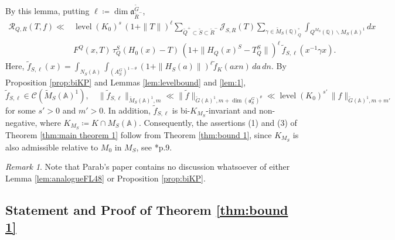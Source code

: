 \documentclass[12pt]{amsart}
\theoremstyle{definition}
\theoremstyle{plain}
\theoremstyle{remark}
\newtheorem{remark}[definition]{Remark}
\def\Q{\mathbb{Q}}%
\def\A{\mathbb{A}}%
\def\bs{\backslash}%
\newcommand{\fa}{\mathfrak{a}}
\newcommand{\cC}{\mathcal{C}}
\newcommand{\cJ}{\mathcal{J}}
\newcommand{\cR}{\mathcal{R}}
\numberwithin{equation}{section}
\newcommand{\tG}{\widetilde{G}}
\newcommand{\tM}{\widetilde{M}}
\newcommand{\tQ}{\widetilde{Q}}
\newcommand{\tR}{\widetilde{R}}
\newcommand{\tS}{\widetilde{S}}
\newcommand{\tf}{\tilde{f}}
\newcommand{\level}{\operatorname{level}}
\begin{document}
By this lemma, putting $\ell \coloneqq \dim\fa_{\tR^-}^{\tG}$, 
\begin{align*}
\cR_{Q,R}(T,f)\ll& \level(K_0)^s \,  (1+\|T\|)^{\ell} \sum_{\tQ^+\subset\tS \subset \tR^-}  \cJ_{S,R}(T)\sum_{\gamma\in \tM_S(\Q)_{Q}^{\circ}} \int_{Q^{M_S}(\Q)\bs M_S(\A)^1}dx   \\  
      & F^Q(x,T)\, \tau_Q^S(H_0(x)-T) \, (1+\|H_Q(x)^S-T_Q^S\|)^{\ell}\, \tf_{S,\ell}(x^{-1}\gamma x). \nonumber
\end{align*}
Here, $\tf_{S,\ell}(x)=\int_{N_S(\A)}\int_{(A_S^G)^{1-\theta}}(1+ \| H_S(a)\| )^{\ell}\tf_{K}(axn)\, da \, dn$. 
By Proposition \ref{prop:biKP} and Lemmas \ref{lem:levelbound} and \ref{lem:1},
\[
\tf_{S,\ell}\in \cC(\tM_S(\A)^1), \quad  \|\tf_{S,\ell}\|_{\tM_S(\A)^1,m} \ll \|\tf\|_{\tG(\A)^1,m+\dim(\fa_S^G)^\theta} \ll \level(K_0)^{s'}\,  \| f \|_{\tG(\A)^1,m+m'}
\]
for some $s'>0$ and $m'>0$. 
In addition, $\tf_{S,\ell}$ is bi-$K_{M_S}$-invariant and non-negative, where $K_{M_S}\coloneqq K\cap M_S(\A)$. 
Consequently, the assertions (1) and (3) of Theorem \ref{thm:main theorem 1} follow from Theorem \ref{thm:bound 1}, since $K_{M_S}$ is also admissible relative to $M_0$ in $M_S$, see \cite{Art81}*{p.9}. 
\begin{remark}
    Note that Parab's paper \cite{Par19} contains no discussion whatsoever of either Lemma \ref{lem:analogueFL48} or Proposition \ref{prop:biKP}.
\end{remark}


\subsection{Statement and Proof of Theorem \ref{thm:bound 1}}
\end{document}

